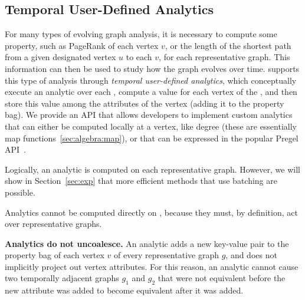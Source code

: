 \subsection{Temporal User-Defined Analytics}
\label{sec:analytics}

For many types of evolving graph analysis, it is necessary to compute
some property, such as PageRank of each vertex $v$, or the length of
the shortest path from a given designated vertex $u$ to each $v$, for
each representative graph.  This information can then be used to study
how the graph evolves over time.  \ql supports this type of analysis
through {\em temporal user-defined analytics}, which conceptually
execute an analytic over each \rg, compute a value for each vertex of
the \rg, and then store this value among the attributes of the vertex
(adding it to the property bag).  We provide an API that allows
developers to implement custom analytics that can either be computed
locally at a vertex, like degree (these are essentially map
functions~\ref{sec:algebra:map}), or that can be expressed in the
popular Pregel API~\cite{DBLP:conf/sigmod/MalewiczABDHLC10}.

Logically, an analytic is computed on each representative graph.
However, we will show in Section~\ref{sec:exp} that more efficient
methods that use batching are possible.


Analytics cannot be computed directly on \tve, because they must, by
definition, act over representative graphs.

{\bf Analytics do not uncoalesce.} An analytic adds a new key-value
pair to the property bag of each vertex $v$ of every representative
graph $g$, and does not implicitly project out vertex attributes.  For
this reason, an analytic cannot cause two temporally adjacent graphs
$g_1$ and $g_2$ that were not equivalent before the new attribute was
added to become equivalent after it was added.



